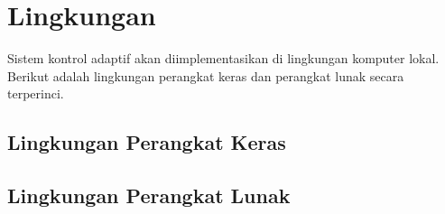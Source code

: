 \section{Lingkungan}

Sistem kontrol adaptif akan diimplementasikan di lingkungan komputer lokal. Berikut adalah lingkungan perangkat keras dan perangkat lunak secara terperinci.

\subsection{Lingkungan Perangkat Keras}
\blindtext

\subsection{Lingkungan Perangkat Lunak}
\blindtext